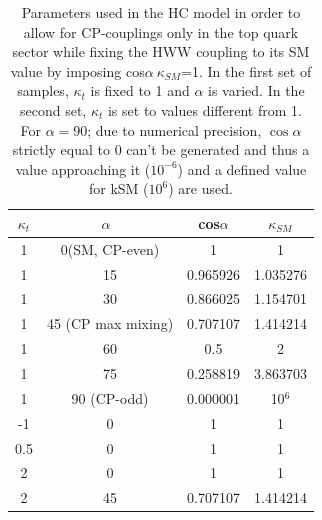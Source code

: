 \begin{table}[h!]
\centering
\begin{tabular}{|c|c|||c|c|}
\hline
$\kappa_{t}$ & $\alpha$\ & cos$\alpha$ & $\kappa_{SM}$\\
\hline
1 & 0(SM, CP-even) & 1 & 1 \\
1 & 15 & 0.965926 & 1.035276 \\
1 & 30 & 0.866025 & 1.154701 \\
1 & 45 (CP max mixing) & 0.707107 & 1.414214 \\
1 & 60 & 0.5 & 2 \\
1 & 75 & 0.258819 & 3.863703 \\
1 & 90 (CP-odd)  & 0.000001 & 10$^{6}$ \\
  \hline \hline
 -1 & 0 & 1 & 1 \\
 0.5 & 0 & 1 & 1 \\
 2 & 0 & 1 & 1 \\
 2 & 45 & 0.707107 & 1.414214 \\
\hline
\end{tabular}
\caption{Parameters used in the HC model in order to allow for CP-couplings only in the top quark sector while fixing the HWW coupling to its SM value by imposing cos$\alpha~\kappa_{SM}$=1. In the first set of samples, $\kappa_{t}$ is fixed to 1 and $\alpha$ is varied. In the second set, $\kappa_{t}$ is set to values different from 1. For $\alpha=90$; due to numerical precision, $\cos\alpha$ strictly equal to 0 can't be generated and thus a value approaching it ($10^{-6}$) and a defined value for kSM ($10^{6}$) are used.}
\label{tab:MCsamples_Parameters}
\end{table}

